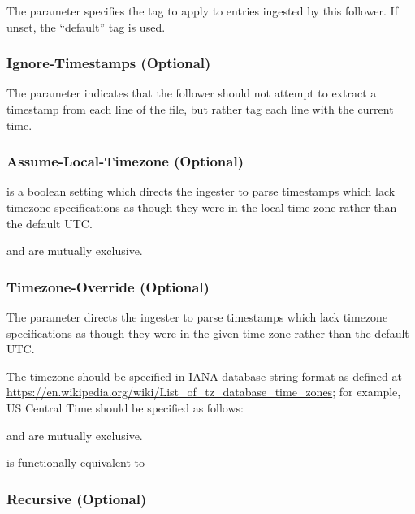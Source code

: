 The  parameter specifies the tag to apply to entries
ingested by this follower. If unset, the ``default'' tag is used.

\subsubsection{Ignore-Timestamps (Optional)}

The  parameter indicates that the follower should
not attempt to extract a timestamp from each line of the file, but
rather tag each line with the current time.

\subsubsection{Assume-Local-Timezone (Optional)}

 is a boolean setting which directs the ingester
to parse timestamps which lack timezone specifications as though they
were in the local time zone rather than the default UTC.

 and  are mutually
exclusive.

\subsubsection{Timezone-Override (Optional)}

The  parameter directs the ingester to parse
timestamps which lack timezone specifications as though they were in the
given time zone rather than the default UTC.

The timezone should be specified in IANA database string format as
defined at \href{https://en.wikipedia.org/wiki/List\_of\_tz\_database\_time\_zones}{https://en.wikipedia.org/wiki/List\_of\_tz\_database\_time\_zones};
for example, US Central Time should be specified as follows:


 and  are mutually
exclusive.

 is functionally equivalent to

\subsubsection{Recursive (Optional)}

